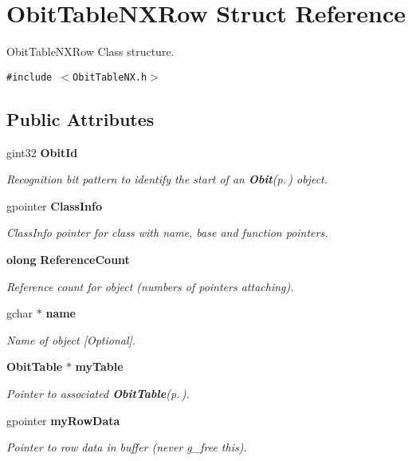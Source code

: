 \section{Obit\-Table\-NXRow Struct Reference}
\label{structObitTableNXRow}
Obit\-Table\-NXRow Class structure.  


{\tt \#include $<$Obit\-Table\-NX.h$>$}

\subsection*{Public Attributes}
\begin{CompactItemize}
\item 
gint32 {\bf Obit\-Id}
\begin{CompactList}\small\item\em Recognition bit pattern to identify the start of an {\bf Obit}{\rm (p.\,\pageref{structObit})} object. \item\end{CompactList}\item 
gpointer {\bf Class\-Info}
\begin{CompactList}\small\item\em Class\-Info pointer for class with name, base and function pointers. \item\end{CompactList}\item 
{\bf olong} {\bf Reference\-Count}
\begin{CompactList}\small\item\em Reference count for object (numbers of pointers attaching). \item\end{CompactList}\item 
gchar $\ast$ {\bf name}
\begin{CompactList}\small\item\em Name of object [Optional]. \item\end{CompactList}\item 
{\bf Obit\-Table} $\ast$ {\bf my\-Table}
\begin{CompactList}\small\item\em Pointer to associated {\bf Obit\-Table}{\rm (p.\,\pageref{structObitTable})}. \item\end{CompactList}\item 
gpointer {\bf my\-Row\-Data}
\begin{CompactList}\small\item\em Pointer to row data in buffer (never g\_\-free this). \item\end{CompactList}\item 

\end{CompactItemize}
